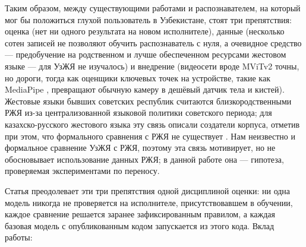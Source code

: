 Таким образом, между существующими работами и распознавателем, на который мог бы положиться глухой пользователь в Узбекистане, стоят три препятствия: оценка (нет ни одного результата на новом исполнителе), данные (несколько сотен записей не позволяют обучить распознаватель с нуля, а очевидное средство --- предобучение на родственном и лучше обеспеченном ресурсами жестовом языке --- для УзЖЯ не изучалось) и внедрение (видеосети вроде MViTv2 \citep{2022_li_mvitv2} точны, но дороги, тогда как оценщики ключевых точек на устройстве, такие как MediaPipe \citep{2020_zhang_mediapipe_hands, docs_mediapipe_holistic_landmarker}, превращают обычную камеру в дешёвый датчик тела и кистей). Жестовые языки бывших советских республик считаются близкородственными РЖЯ из-за централизованной языковой политики советского периода; для казахско-русского жестового языка эту связь описали создатели корпуса, отметив при этом, что формального сравнения с РЖЯ не существует \citep{2020_imashev_krsl_dataset, 2024_imashev_krsl_retrospective}. Нам неизвестно и формальное сравнение УзЖЯ с РЖЯ, поэтому эта связь мотивирует, но не обосновывает использование данных РЖЯ; в данной работе она --- гипотеза, проверяемая экспериментами по переносу.

Статья преодолевает эти три препятствия одной дисциплиной оценки: ни одна модель никогда не проверяется на исполнителе, присутствовавшем в обучении, каждое сравнение решается заранее зафиксированным правилом, а каждая базовая модель с опубликованным кодом запускается из этого кода. Вклад работы:

